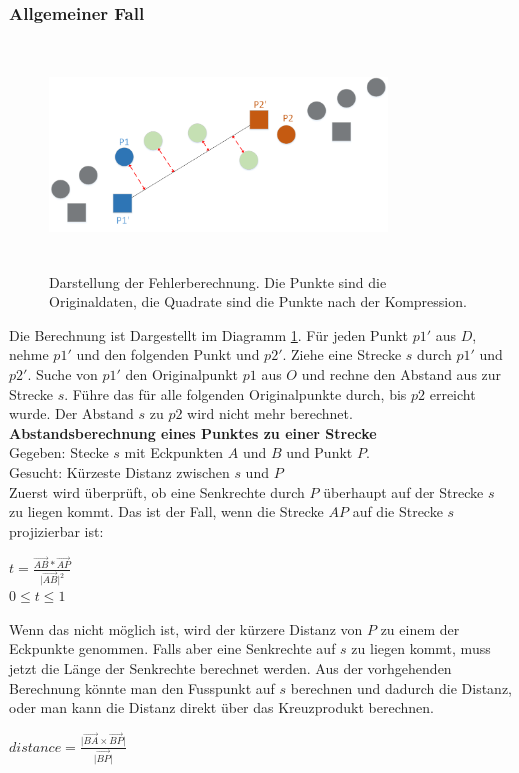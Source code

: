 \subsubsection{Allgemeiner Fall}
\begin{figure}[!htbp]
	\center
	\includegraphics[width=0.8\textwidth,height=6cm,keepaspectratio]{./pictures/testsetup/errorcalc.png}
	\caption{Darstellung der Fehlerberechnung. Die Punkte sind die Originaldaten, die Quadrate sind die Punkte nach der Kompression.}
	\label{testsetup:ablauf:fehlerberechnung:diagramm}
\end{figure} 
Die Berechnung ist Dargestellt im Diagramm \ref{testsetup:ablauf:fehlerberechnung:diagramm}. Für jeden Punkt $p1'$ aus $D$, nehme $p1'$ und den folgenden Punkt und $p2'$. Ziehe eine Strecke $s$ durch $p1'$ und $p2'$. Suche von $p1'$ den Originalpunkt $p1$ aus $O$ und rechne den Abstand aus zur Strecke $s$. Führe das für alle folgenden Originalpunkte durch, bis $p2$ erreicht wurde. Der Abstand $s$ zu $p2$ wird nicht mehr berechnet.\\
[\baselineskip]
\textbf{Abstandsberechnung eines Punktes zu einer Strecke}\\
Gegeben: Stecke $s$ mit Eckpunkten $A$ und $B$ und Punkt $P$.\\
Gesucht: Kürzeste Distanz zwischen $s$ und $P$\\
[\baselineskip]
Zuerst wird überprüft, ob eine Senkrechte durch $P$ überhaupt auf der Strecke $s$ zu liegen kommt. Das ist der Fall, wenn die Strecke $AP$ auf die Strecke $s$ projizierbar ist:
\begin{center}
$ t = \frac{\vec{AB}*\vec{AP}}{\lvert \vec{AB}\rvert ^2}$\\
  $0 \leq t \leq 1$
\end{center}
Wenn das nicht möglich ist, wird der kürzere Distanz von $P$ zu einem der Eckpunkte genommen. Falls aber eine Senkrechte auf $s$ zu liegen kommt, muss jetzt die Länge der Senkrechte berechnet werden. Aus der vorhgehenden Berechnung könnte man den Fusspunkt auf $s$ berechnen und dadurch die Distanz, oder man kann die Distanz direkt über das Kreuzprodukt berechnen.
\begin{center}
  $distance = \frac{\lvert \vec{BA}\times \vec{BP}\rvert}{\lvert \vec{BP} \rvert}$
\end{center}

